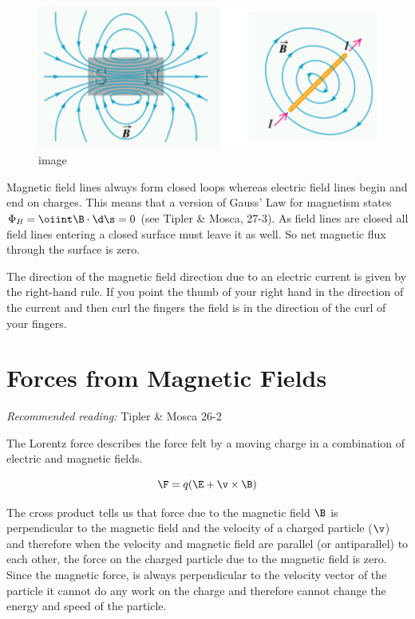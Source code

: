 \documentclass[
]{book}
\begin{document}
\begin{figure}
\centering
\includegraphics[width=120mm,height=\textheight]{Figures/MagFields.png}
\caption{image}
\end{figure}

Magnetic field lines always form closed loops whereas electric field
lines begin and end on charges. This means that a version of Gauss' Law
for magnetism states \(\Phi_B = \oiint \B \cdot \d\s = 0\) (see Tipler \&
Mosca, 27-3). As field lines are closed all field lines entering a
closed surface must leave it as well. So net magnetic flux through the
surface is zero.

The direction of the magnetic field direction due to an electric current
is given by the right-hand rule. If you point the thumb of your right
hand in the direction of the current and then curl the fingers the field
is in the direction of the curl of your fingers.

\hypertarget{forces-from-magnetic-fields}{%
\section{Forces from Magnetic Fields}\label{forces-from-magnetic-fields}}

\emph{Recommended reading:} Tipler \& Mosca 26-2

The Lorentz force describes the force felt by a moving charge in a
combination of electric and magnetic fields.

\[\F = q(\E + \v \times \B)\]

The cross product tells us that force due to the magnetic field \(\B\) is
perpendicular to the magnetic field and the velocity of a charged
particle (\(\v\)) and therefore when the velocity and magnetic field are
parallel (or antiparallel) to each other, the force on the charged
particle due to the magnetic field is zero. Since the magnetic force, is
always perpendicular to the velocity vector of the particle it cannot do
any work on the charge and therefore cannot change the energy and speed
of the particle.
\end{document}
